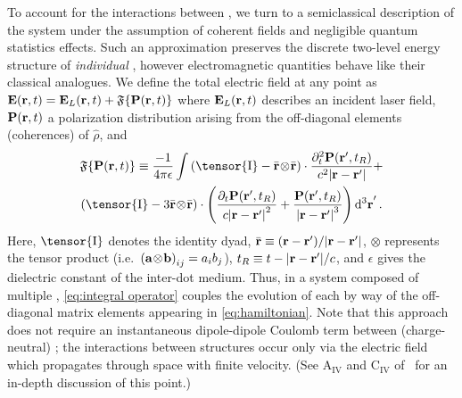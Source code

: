 To account for the interactions between \qds{}, we turn to a semiclassical description of the system under the assumption of coherent fields and negligible quantum  statistics effects.
Such an approximation preserves the discrete two-level energy structure of \emph{individual} \qds{}, however electromagnetic quantities behave like their classical analogues.
We define the total electric field at any point as $\vb{E}(\vb{r}, t) = \vb{E}_L(\vb{r}, t) + \mathfrak{F}\{ \vb{P}(\vb{r}, t) \}$
where $\vb{E}_L(\vb{r}, t)$ describes an incident laser field, $\vb{P}(\vb{r}, t)$ a polarization distribution arising from  the off-diagonal elements (coherences) of $\hat{\rho}$, and~\cite{Landau2013,Rothwell2009}
\begin{equation}
  \begin{gathered}
    \mathfrak{F}\{\vb{P}(\vb{r}, t)\} \equiv
      \frac{-1}{4\pi \epsilon} \int
      \left(\tensor{\mathrm{I}} -  \outerprod{\bar{\vb{r}}}{\bar{\vb{r}}} \right) \cdot \frac{\partial_t^2 \vb{P}(\vb{r}', t_R)}{c^2 \abs{\vb{r}-\vb{r}'}} + \\
      \left(\tensor{\mathrm{I}} - 3\outerprod{\bar{\vb{r}}}{\bar{\vb{r}}} \right) \cdot \qty(
        \frac{\partial_t   \vb{P}(\vb{r}', t_R)}{c \abs{\vb{r}-\vb{r}'}^2} +
        \frac{             \vb{P}(\vb{r}', t_R)}{  \abs{\vb{r}-\vb{r}'}^3}
      ) \dd[3]{\vb{r}}'.
  \end{gathered}
  \label{eq:integral operator}
\end{equation}
Here, $\tensor{\mathrm{I}}$ denotes the identity dyad, $\bar{\vb{r}} \equiv \qty(\vb{r} - \vb{r}')/\abs{\vb{r} - \vb{r}'}$, $\otimes$ represents the tensor product (i.e.\ $\qty(\vb{a} \! \otimes \! \vb{b})_{ij} = a_i b_j$), $t_R \equiv t - \abs{\vb{r} - \vb{r}'}/c$, and $\epsilon$ gives the dielectric constant of the inter-dot medium.
Thus, in a system composed of multiple \qds{}, \cref{eq:integral operator} couples the evolution of each \qd{} by way of the off-diagonal matrix elements appearing in \cref{eq:hamiltonian}.
Note that this approach does not require an instantaneous dipole-dipole Coulomb term between (charge-neutral) \qds{}; the interactions between structures occur only via the electric field which propagates through space with finite velocity.
(See {A}$_{\text{IV}}$  and {C}$_{\text{IV}}$ of~\cite{Cohen1989} for an in-depth discussion of this point.)


